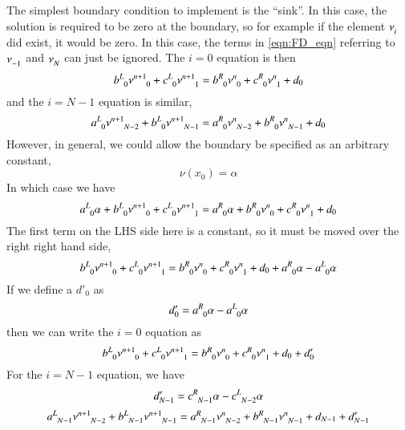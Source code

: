 \documentclass[letterpaper,12pt]{article}
\begin{document}
The simplest boundary condition to implement is the ``sink''. In this case, the
solution is required to be zero at the boundary, so for example if the element
$\nu\indices{_i}$ did exist, it would be zero. In this case, the terms in
\ref{eqn:FD_eqn} referring to $\nu\indices{_{-1}}$ and  $\nu\indices{_{N}}$ can
just be ignored. The $i=0$ equation is then
\begin{equation}
  \label{eqn:FD_sink_eqn}
  b\indices{^L_0} \nu\indices{^{n+1}_{0}}
+ c\indices{^L_0} \nu\indices{^{n+1}_{1}}
=
  b\indices{^R_0} \nu\indices{^{n  }_{0}}
+ c\indices{^R_0} \nu\indices{^{n  }_{1}}
+ d_0
\end{equation}
and the $i = N-1$ equation is similar,
\begin{equation}
  \label{eqn:FD_sink_eqn_2}
  a\indices{^L_0} \nu\indices{^{n+1}_{N-2}}
+ b\indices{^L_0} \nu\indices{^{n+1}_{N-1}}
=
  a\indices{^R_0} \nu\indices{^{n  }_{N-2}}
+ b\indices{^R_0} \nu\indices{^{n  }_{N-1}}
+ d_0
\end{equation}
However, in general, we could allow the boundary be specified as an arbitrary constant,
\begin{equation}
  \nu\left(x_0\right) = \alpha
\end{equation}
In which case we have
\begin{equation}
  a\indices{^L_0} \alpha
+ b\indices{^L_0} \nu\indices{^{n+1}_{0}}
+ c\indices{^L_0} \nu\indices{^{n+1}_{1}}
=
  a\indices{^R_0} \alpha
+ b\indices{^R_0} \nu\indices{^{n  }_{0}}
+ c\indices{^R_0} \nu\indices{^{n  }_{1}}
+ d_0
\end{equation}
The first term on the LHS side here is a constant, so it must be moved over the right right hand side,
\begin{equation}
  b\indices{^L_0} \nu\indices{^{n+1}_{0}}
+ c\indices{^L_0} \nu\indices{^{n+1}_{1}}
=
  b\indices{^R_0} \nu\indices{^{n  }_{0}}
+ c\indices{^R_0} \nu\indices{^{n  }_{1}}
+ d_0
+ a\indices{^R_0} \alpha
- a\indices{^L_0} \alpha
\end{equation}
If we define a $d'_0$ as
\begin{equation}
d'_0 = a\indices{^R_0} \alpha - a\indices{^L_0} \alpha
\end{equation}
then we can write the $i=0$ equation as
\begin{equation}
  b\indices{^L_0} \nu\indices{^{n+1}_{0}}
+ c\indices{^L_0} \nu\indices{^{n+1}_{1}}
=
  b\indices{^R_0} \nu\indices{^{n  }_{0}}
+ c\indices{^R_0} \nu\indices{^{n  }_{1}}
+ d_0
+ d'_0
\end{equation}
For the $i=N-1$ equation, we have
\begin{equation}
  d'_{N-1} = c\indices{^R_{N-1}} \alpha - c\indices{^L_{N-2}} \alpha
\end{equation}
\begin{equation}
  a\indices{^L_{N-1}} \nu\indices{^{n+1}_{N-2}}
+ b\indices{^L_{N-1}} \nu\indices{^{n+1}_{N-1}}
=
  a\indices{^R_{N-1}} \nu\indices{^{n  }_{N-2}}
+ b\indices{^R_{N-1}} \nu\indices{^{n  }_{N-1}}
+ d_{N-1}
+ d'_{N-1}
\end{equation}
\end{document}

